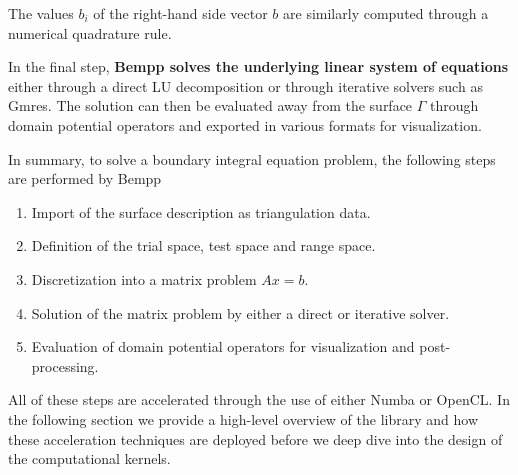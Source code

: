 The values $b_i$ of the right-hand side vector $b$ are similarly computed through a numerical quadrature rule.

In the final step, \textbf{Bempp solves the underlying linear system of equations} either through a direct LU decomposition or through iterative solvers such as Gmres. The solution can then be evaluated away from the surface $\Gamma$ through domain potential operators and exported in various formats for visualization.

In summary, to solve a boundary integral equation problem, the following steps are performed by Bempp
\begin{enumerate}
	\item Import of the surface description as triangulation data.
	\item Definition of the trial space, test space and range space.
	\item Discretization into a matrix problem $Ax=b$.
	\item Solution of the matrix problem by either a direct or iterative solver.
	\item Evaluation of domain potential operators for visualization and post-processing.
\end{enumerate}

All of these steps are accelerated through the use of either Numba or OpenCL. In the following section we provide a high-level overview of the library and how these acceleration techniques are deployed before we deep dive into the design of the computational kernels.

